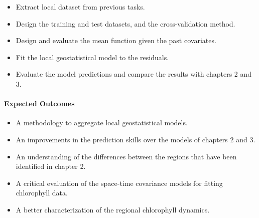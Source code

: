 \begin{itemize}

\item Extract local dataset from previous tasks.

\item Design the training and test datasets, and the cross-validation method.

\item Design and evaluate the mean function given the past covariates.

\item Fit the local geostatistical model to the residuals.

\item Evaluate the model predictions and compare the results with chapters 2
and 3.

\end{itemize}

\paragraph{Expected Outcomes}

\begin{itemize}

\item A methodology to aggregate local geostatistical models.

\item An improvements in the prediction skills over the models of chapters 2
and 3.

\item An understanding of the differences between the regions that have
been identified in chapter 2.

\item A critical evaluation of the space-time covariance models for fitting
chlorophyll data.

\item A better characterization of the regional chlorophyll dynamics.

\end{itemize}
